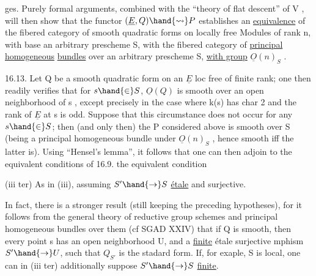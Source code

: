 
ges. Purely formal arguments, combined with the
``theory of flat descent'' of  V  , will then show that the functor
$(\underline{E},Q) \hand{\rightsquigarrow} P$ establishes an \uline{equivalence} of the fibered category of smooth
quadratic forms on locally free Modules of rank n, with base
an arbitrary prescheme S, with the fibered category of \uline{principal homogeneous}
\uline{bundles} over an arbitrary prescheme S, \uline{with group} $\underline{O}(n)_S$ .

16.13. Let Q be a smooth quadratic form on an $\underline{E}$ loc free of
finite rank; one then readily verifies that for $s \hand{\in} S$, $\underline{O}(Q)$ is smooth
over an open neighborhood of s ,  except precisely in
the case where k(s) has char 2 and the rank of $\underline{E}$ at s is odd. Suppose
that this circumstance does not occur for any $s \hand{\in} S$; then (and only
then) the P considered above is smooth over S (being a principal
homogeneous bundle under $\underline{O}(n)_S$ , hence smooth iff the latter is). Using
``Hensel's lemma'', it follows that  one can then adjoin to the
equivalent conditions of 16.9. the equivalent condition

(iii ter)  As in (iii), assuming $S' \hand{\to} S$
\uline{étale} and surjective.

In fact, there is a stronger result (still keeping the preceding
hypotheses), for it follows from the general theory of reductive group schemes
and principal homogeneous bundles over them (cf SGAD XXIV) that  if Q is
smooth, then every point s has an open neighborhood U, and a \uline{finite}
étale surjective mphism $S' \hand{\to} U$, such that $Q_{S'}$ is the stadard form. If, for exaple,
S is local, one can in (iii ter) additionally suppose $S' \hand{\to} S$ \uline{finite}.

